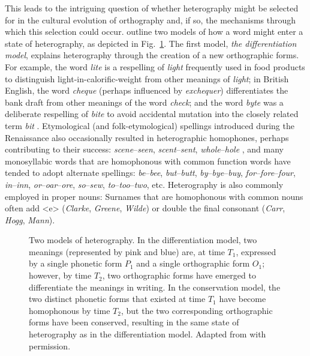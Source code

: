 \documentclass[doc,biblatex]{apa7}
\begin{document}
This leads to the intriguing question of whether heterography might be selected for in the cultural evolution of orthography and, if so, the mechanisms through which this selection could occur. \textcite[pp.~325--326]{Berg:2021} outline two models of how a word might enter a state of heterography, as depicted in Fig.~\ref{models_of_heterography}. The first model, \textit{the differentiation model}, explains heterography through the creation of a new orthographic forms. For example, the word \textit{lite} is a respelling of \textit{light} frequently used in food products to distinguish light-in-calorific-weight from other meanings of \textit{light}; in British English, the word \textit{cheque} (perhaps influenced by \textit{exchequer}) differentiates the bank draft from other meanings of the word \textit{check}; and the word \textit{byte} was a deliberate respelling of \textit{bite} to avoid accidental mutation into the closely related term \textit{bit} \parencite{Buchholz:1977}. Etymological (and folk-etymological) spellings introduced during the Renaissance also occasionally resulted in heterographic homophones, perhaps contributing to their success: \textit{scene}--\textit{seen}, \textit{scent}--\textit{sent}, \textit{whole}--\textit{hole} \parencite[pp.~58--59]{Scragg:1974}, and many monosyllabic words that are homophonous with common function words have tended to adopt alternate spellings: \textit{be}--\textit{bee}, \textit{but}--\textit{butt}, \textit{by}--\textit{bye}--\textit{buy}, \textit{for}--\textit{fore}--\textit{four}, \textit{in}--\textit{inn}, \textit{or}--\textit{oar}--\textit{ore}, \textit{so}--\textit{sew}, \textit{to}--\textit{too}--\textit{two}, etc. Heterography is also commonly employed in proper nouns: Surnames that are homophonous with common nouns often add <e> (\textit{Clarke}, \textit{Greene}, \textit{Wilde}) or double the final consonant (\textit{Carr}, \textit{Hogg}, \textit{Mann}).

	\begin{figure}
	\vspace*{2pt}
	\caption{Two models of heterography. In the differentiation model, two meanings (represented by pink and blue) are, at time $T_1$, expressed by a single phonetic form $P_1$ and a single orthographic form $O_1$; however, by time $T_2$, two orthographic forms have emerged to differentiate the meanings in writing. In the conservation model, the two distinct phonetic forms that existed at time $T_1$ have become homophonous by time $T_2$, but the two corresponding orthographic forms have been conserved, resulting in the same state of heterography as in the differentiation model. Adapted from \textcite[pp.~325--326]{Berg:2021} with permission.}
	\label{models_of_heterography}
	\end{figure}
\end{document}
